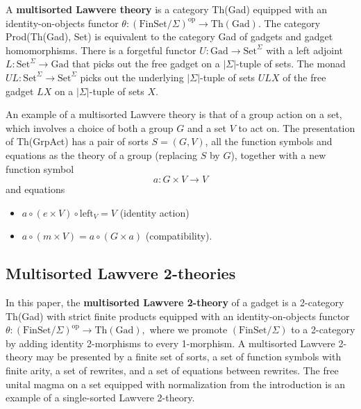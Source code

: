 \documentclass{article}
\newcommand{\maps}{\colon}
\newcommand{\FinSet}{\mathrm{FinSet}}
\newcommand{\Set}{\mathrm{Set}}
\newcommand{\Gad}{\mathrm{Gad}}
\newcommand{\op}{\mathrm{op}}
\begin{document}
A {\bf multisorted Lawvere theory} is a category Th(Gad) equipped with an identity-on-objects functor ${\theta\maps (\FinSet/\Sigma)^\op \to \mathrm{Th(Gad)}.}$  The category Prod(\allowbreak Th(Gad), Set) is equivalent to the category Gad of gadgets and gadget homomorphisms.  There is a forgetful functor ${U\maps \Gad \to \Set^\Sigma}$ with a left adjoint ${L\maps \Set^\Sigma \to \Gad}$ that picks out the free gadget on a $|\Sigma|$-tuple of sets.  The monad ${UL\maps \Set^\Sigma \to \Set^\Sigma}$ picks out the underlying $|\Sigma|$-tuple of sets $ULX$ of the free gadget $LX$ on a $|\Sigma|$-tuple of sets $X$.

An example of a multisorted Lawvere theory is that of a group action on a set, which involves a choice of both a group $G$ and a set $V$ to act on.  The presentation of Th(GrpAct) has a pair of sorts $S = (G, V)$, all the function symbols and equations as the theory of a group (replacing $S$ by $G$), together with a new function symbol
\[ a\maps G \times V \to V \]
and equations
\begin{itemize}
  \item $a \circ (e \times V) \circ \mathrm{left}_V = V$ (identity action)
  \item $a \circ (m \times V) = a \circ (G \times a)$ (compatibility).
\end{itemize}

\subsection {Multisorted Lawvere 2-theories}
In this paper, the {\bf multisorted Lawvere 2-theory} of a gadget is a 2-category Th(Gad) with strict finite products equipped with an identity-on-objects functor $\theta\maps (\FinSet/\Sigma)^\op \to \mathrm{Th(Gad)},$ where we promote $(\FinSet/\Sigma)$ to a 2-category by adding identity 2-morphisms to every 1-morphism.  A multisorted Lawvere 2-theory may be presented by a finite set of sorts, a set of function symbols with finite arity, a set of rewrites, and a set of equations between rewrites.  The free unital magma on a set equipped with normalization from the introduction is an example of a single-sorted Lawvere 2-theory.  
\end{document}
